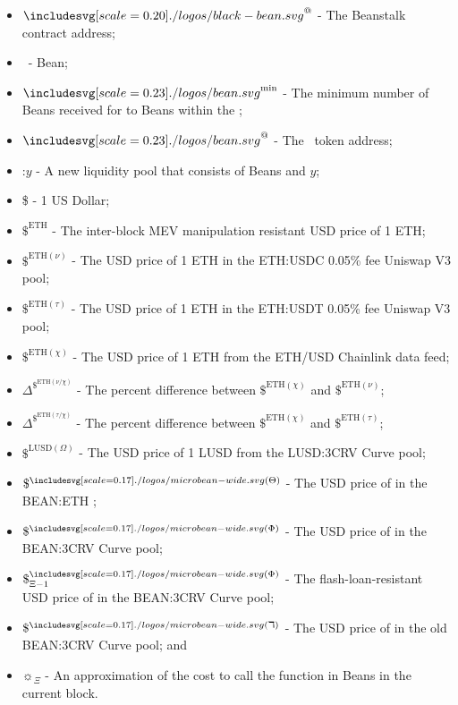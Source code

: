 \documentclass[class=article, crop=false]{standalone}
\begin{document}
\begin{itemize}[topsep=0pt, itemsep=3pt,leftmargin=16pt]
    \item[] $\Beanstalk^{@}$ - The Beanstalk contract address;
    \item[] \Bean\ - Bean;
    \item[] $\Bean^{\text{min}}$ - The minimum number of Beans received for  to  Beans within the ;
    \item[] $\Bean^{@}$ - The \Bean\ token address;
    \item[] \Bean:$y$ - \hypertarget{ht6}{A new liquidity pool that consists of Beans and $y$};
    \item[] \$ - 1 US Dollar;
    \item[] $\$^{\text{ETH}}$ - The inter-block MEV manipulation resistant USD price of 1 ETH;
    \item[] $\$^{\text{ETH}(\nu)}$ - The USD price of 1 ETH in the ETH:USDC 0.05\% fee Uniswap V3 pool;
    \item[] $\$^{\text{ETH}(\tau)}$ - The USD price of 1 ETH in the ETH:USDT 0.05\% fee Uniswap V3 pool;
    \item[] $\$^{\text{ETH}(\chi)}$ - The USD price of 1 ETH from the ETH/USD Chainlink data feed;
    \item[] $\Delta^{\$^{\text{ETH}(\nu \slash \chi)}}$ - The percent difference between $\$^{\text{ETH}(\chi)}$ and $\$^{\text{ETH}(\nu)}$;
    \item[] $\Delta^{\$^{\text{ETH}(\tau \slash \chi)}}$ - The percent difference between $\$^{\text{ETH}(\chi)}$ and $\$^{\text{ETH}(\tau)}$;
    \item[] $\$^{\text{LUSD}(\Omega)}$ - \hypertarget{ht4}{The USD price of 1 LUSD from the LUSD:3CRV Curve pool};
    \item[] $\$^{\bean(\Theta)}$ - The USD price of  in the BEAN:ETH ;
    \item[] $\$^{\bean(\Phi)}$ - \hypertarget{ht2}{The USD price of  in the BEAN:3CRV Curve pool};
    \item[] $\$^{\bean(\Phi)}_{\Xi-1}$ - \hypertarget{ht3}{The flash-loan-resistant USD price of  in the BEAN:3CRV Curve pool};
    \item[] $\$^{\bean(\daleth)}$ - \hypertarget{ht1a}{The USD price of  in the old BEAN:3CRV Curve pool}; and
    \item[] $\sun_{\Xi}$ - An approximation of the cost to call the  function in Beans in the current block.
\end{itemize}
\end{document}
